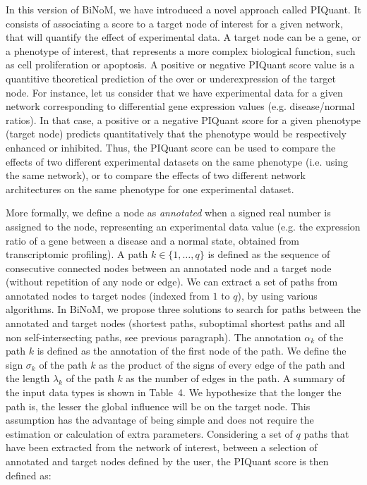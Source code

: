 \documentclass[11pt]{bmc_article_s50}
\newenvironment{bmcformat}{\begin{raggedright}\baselineskip20pt\sloppy\setboolean{publ}{false}}{\end{raggedright}\baselineskip20pt\sloppy}
\begin{document}
\begin{bmcformat}
In this version of BiNoM, we have introduced a novel approach called PIQuant. It consists of associating a score to a
target node of interest for a given network, that will quantify the effect of
experimental data.
A target node can be a gene, or a phenotype of interest, that represents a more complex
biological function, such as cell proliferation or apoptosis.
A positive or negative PIQuant score value is a quantitive theoretical
prediction of the over or underexpression of
the target node. For instance, let us consider that we have experimental data for a given network
 corresponding to differential gene expression values (e.g.
disease/normal ratios).
In that case, a positive or a negative PIQuant score for a given phenotype
(target node) predicts quantitatively
that the phenotype would be respectively enhanced or inhibited.
Thus, the PIQuant score can be used to
compare the effects of two different experimental datasets on the same phenotype
(i.e. using the same network), or to compare the effects of two different network
architectures on the same phenotype for one experimental dataset.


More formally, we define a node as \textit{annotated} when a signed real
number is assigned to the node, representing an experimental data value (e.g.
the expression ratio of a gene between a disease and a normal state, obtained
from transcriptomic profiling).
 A path $k \in \{1,\ldots , q\}$ is defined
as the sequence of consecutive connected nodes
between an annotated node and a target node (without repetition of any node
or edge). We can extract a set of paths from annotated nodes to target nodes (indexed
from $1$ to $q$), by using various algorithms. In BiNoM, we propose three solutions to search for paths between the
annotated and target nodes (shortest paths, suboptimal shortest paths and all
non self-intersecting paths, see previous paragraph). The annotation
$\alpha_k$ of the path $k$ is defined as the annotation
of the first node of the path. We define the sign $\sigma_k$
of the path $k$ as the product of the signs of every edge of the path and
the length $\lambda_k$ of the path $k$ as the number of edges in the path. A summary of the input data types is shown in Table~4. We
hypothesize that the longer the path is, the lesser the global influence will be
on the target node. This assumption has the advantage of being simple and does
not require the estimation or calculation of extra parameters.
Considering a set of $q$ paths that have been extracted from the network
of interest, between a selection of annotated and target nodes defined by the user, the PIQuant score is then defined as:


\end{bmcformat}
\end{document}
